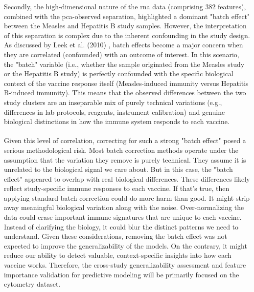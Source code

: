 \documentclass[12pt,a4paper]{report}
\begin{document}
Secondly, the high-dimensional nature of the \acrshort{rna} data (comprising 382 features), combined with the \gls{pca}-observed separation, highlighted a dominant "batch effect" between the Measles and Hepatitis B study samples. However, the interpretation of this separation is complex due to the inherent confounding in the study design. As discussed by Leek et al. (2010) \cite{Leek2010Tackling}, batch effects become a major concern when they are correlated (confounded) with an outcome of interest. In this scenario, the "batch" variable (i.e., whether the sample originated from the Measles study or the Hepatitis B study) is perfectly confounded with the specific biological context of the vaccine response itself (Measles-induced immunity versus Hepatitis B-induced immunity). This means that the observed differences between the two study clusters are an inseparable mix of purely technical variations (e.g., differences in lab protocols, reagents, instrument calibration) and genuine biological distinctions in how the immune system responds to each vaccine.\\
\\
Given this level of correlation, correcting for such a strong "batch effect" posed a serious methodological risk. Most batch correction methods operate under the assumption that the variation they remove is purely technical. They assume it is unrelated to the biological signal we care about. But in this case, the "batch effect" appeared to overlap with real biological differences. These differences likely reflect study-specific immune responses to each vaccine. If that's true, then applying standard batch correction could do more harm than good. It might strip away meaningful biological variation along with the noise. Over-normalizing the data could erase important immune signatures that are unique to each vaccine. Instead of clarifying the biology, it could blur the distinct patterns we need to understand. Given these considerations, removing the batch effect was not expected to improve the generalizability of the models. On the contrary, it might reduce our ability to detect valuable, context-specific insights into how each vaccine works. Therefore, the cross-study generalizability assessment and feature importance validation for predictive modeling will be primarily focused on the cytometry dataset.
\end{document}
